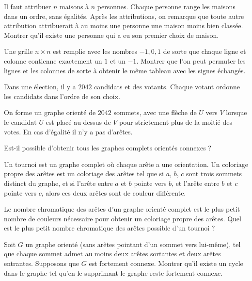 \begin{exo}
Il faut attribuer $n$ maisons à $n$ personnes. Chaque personne range les maisons dans un ordre, sans égalités. Après les attributions, on remarque que toute autre attribution attribuerait à au moins une personne une maison moins bien classée. Montrer qu'il existe une personne qui a eu son premier choix de maison.
\end{exo}


\begin{exo}
Une grille $n\times n$ est remplie avec les nombres $-1, 0, 1$ de sorte que chaque ligne et colonne contienne exactement un $1$ et un $-1$. Montrer que l'on peut permuter les lignes et les colonnes de sorte à obtenir le même tableau avec les signes échangés.
\end{exo}


\begin{exo}
Dans une élection, il y a $2042$ candidats et des votants. Chaque votant ordonne les candidats dans l'ordre de son choix.

On forme un graphe orienté de $2042$ sommets, avec une flèche de $U$ vers $V$ lorsque le candidat $U$ est placé au dessus de $V$ pour strictement plus de la moitié des votes. En cas d'égalité il n'y a pas d'arêtes.

Est-il possible d'obtenir tous les graphes complets orientés connexes ?
\end{exo}


\begin{exo}
Un tournoi est un graphe complet où chaque arête a une orientation. Un coloriage propre des arêtes est un coloriage des arêtes tel que si $a$, $b$, $c$ sont trois sommets distinct du graphe, et si l'arête entre $a$ et $b$ pointe vers $b$, et l'arête entre $b$ et $c$ pointe vers $c$, alors ces deux arêtes sont de couleur différente.

Le nombre chromatique des arêtes d'un graphe orienté complet est le plus petit nombre de couleurs nécessaire pour obtenir un coloriage propre des arêtes. Quel est le plus petit nombre chromatique des arêtes possible d'un tournoi ?
\end{exo}

\begin{exo}%
Soit $G$ un graphe orienté (sans arêtes pointant d'un sommet vers lui-même), tel que chaque sommet admet au moins deux arêtes sortantes et deux arêtes entrantes. Supposons que $G$ est fortement connexe. Montrer qu'il existe un cycle dans le graphe tel qu'en le supprimant le graphe reste fortement connexe.
\end{exo}


